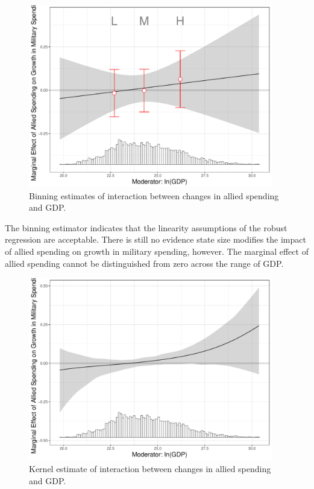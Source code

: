 \documentclass[12pt]{article}
\begin{document}
\begin{figure}
	\centering
		\includegraphics[width=0.95\textwidth]{inter-bin-abs.pdf}
		\caption{Binning estimates of interaction between changes in allied spending and GDP.}
	\label{fig:inter-bin-abs}
\end{figure}


The binning estimator indicates that the linearity assumptions of the robust regression are acceptable. 
There is still no evidence state size modifies the impact of allied spending on growth in military spending, however. 
The marginal effect of allied spending cannot be distinguished from zero across the range of GDP. 


\begin{figure}
	\centering
		\includegraphics[width=0.95\textwidth]{inter-kernel-abs.pdf}
	\caption{Kernel estimate of interaction between changes in allied spending and GDP.}
	\label{fig:inter-kernel-abs}
\end{figure}
\end{document}
